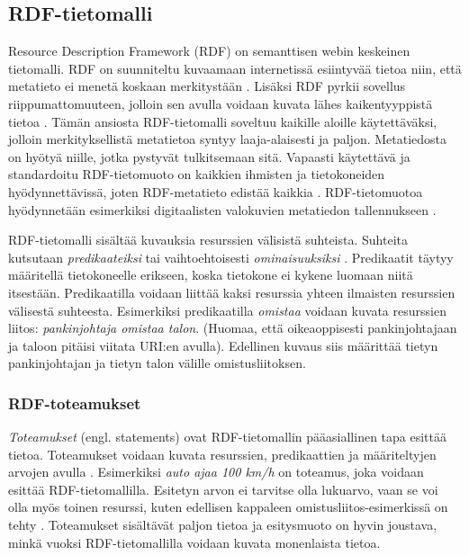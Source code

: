 \documentclass[finnish, 12pt, a4paper, elec, utf8, pdfa, online]{aaltothesis}
\begin{document}
\subsection{RDF-tietomalli}
Resource Description Framework (RDF) on semanttisen webin keskeinen tietomalli. RDF on suunniteltu kuvaamaan internetissä esiintyvää tietoa niin, että metatieto ei menetä koskaan merkitystään \cite{RDF_specification}. Lisäksi RDF pyrkii sovellus riippumattomuuteen, jolloin sen avulla voidaan kuvata lähes kaikentyyppistä tietoa \cite{RDF_specification}. Tämän ansiosta RDF-tietomalli soveltuu kaikille aloille käytettäväksi, jolloin merkityksellistä metatietoa syntyy laaja-alaisesti ja paljon. Metatiedosta on hyötyä niille, jotka pystyvät tulkitsemaan sitä. Vapaasti käytettävä ja standardoitu RDF-tietomuoto on kaikkien ihmisten ja tietokoneiden hyödynnettävissä, joten RDF-metatieto edistää kaikkia \cite{metadata}. RDF-tietomuotoa hyödynnetään esimerkiksi digitaalisten valokuvien metatiedon tallennukseen \cite{XMP1} \cite{profium_metadata}.

RDF-tietomalli sisältää kuvauksia resurssien välisistä suhteista. Suhteita kutsutaan \textit{predikaateiksi} tai vaihtoehtoisesti \textit{ominaisuuksiksi} \cite{Antoniou}. Predikaatit täytyy määritellä tietokoneelle erikseen, koska tietokone ei kykene luomaan niitä itsestään. Predikaatilla voidaan liittää kaksi resurssia yhteen ilmaisten resurssien välisestä suhteesta. Esimerkiksi predikaatilla \textit{omistaa} voidaan kuvata resurssien liitos: \textit{pankinjohtaja omistaa talon}. (Huomaa, että oikeaoppisesti pankinjohtajaan ja taloon pitäisi viitata URI:en avulla). Edellinen kuvaus siis määrittää tietyn pankinjohtajan ja tietyn talon välille omistusliitoksen.

\subsubsection{RDF-toteamukset}
\enlargethispage{1\baselineskip}
\textit{Toteamukset} (engl. statements) ovat RDF-tietomallin pääasiallinen tapa esittää tietoa. Toteamukset voidaan kuvata resurssien, predikaattien ja määriteltyjen arvojen avulla \cite{Antoniou}. Esimerkiksi \textit{auto ajaa 100 km/h} on toteamus, joka voidaan esittää RDF-tietomallilla. Esitetyn arvon ei tarvitse olla lukuarvo, vaan se voi olla myös toinen resurssi, kuten edellisen kappaleen omistusliitos-esimerkissä on tehty \cite{Antoniou}\cite{IEEE_XML}. Toteamukset sisältävät paljon tietoa ja esitysmuoto on hyvin joustava, minkä vuoksi RDF-tietomallilla voidaan kuvata monenlaista tietoa.
\end{document}
